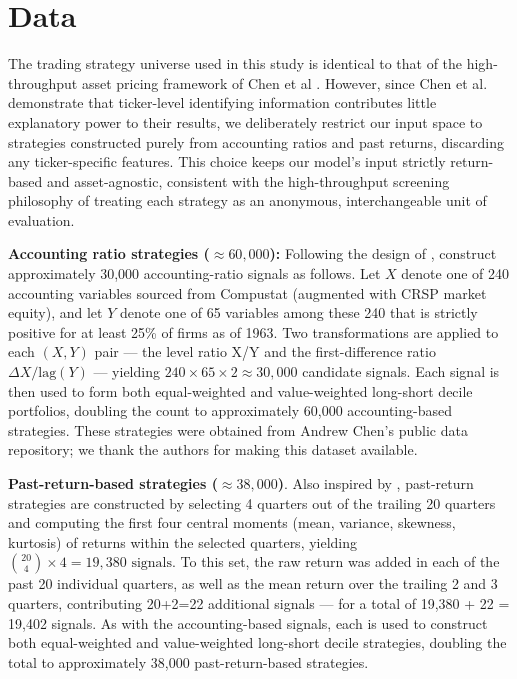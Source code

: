 \documentclass[pdflatex,sn-mathphys-num]{sn-jnl}%
\theoremstyle{thmstyleone}%
\theoremstyle{thmstyletwo}%
\theoremstyle{thmstylethree}%
\begin{document}
\section{Data}\label{sec4}
The trading strategy universe used in this study is identical to that of the high-throughput asset pricing framework of Chen et al \cite{chen2025highthroughputassetpricing}. However, since Chen et al. demonstrate that ticker-level identifying information contributes little explanatory power to their results, we deliberately restrict our input space to strategies constructed purely from accounting ratios and past returns, discarding any ticker-specific features. This choice keeps our model's input strictly return-based and asset-agnostic, consistent with the high-throughput screening philosophy of treating each strategy as an anonymous, interchangeable unit of evaluation.

\textbf{Accounting ratio strategies ($\approx 60,000$):} Following the design of \citet{yan2017fundamental}, \citet{chen2025highthroughputassetpricing} construct approximately 30,000 accounting-ratio signals as follows. Let $X$ denote one of 240 accounting variables sourced from Compustat (augmented with CRSP market equity), and let $Y$ denote one of 65 variables among these 240 that is strictly positive for at least 25\% of firms as of 1963. Two transformations are applied to each $(X, Y)$ pair — the level ratio X/Y and the first-difference ratio $\Delta X / \mathrm{lag}(Y)$ — yielding $240 \times 65 \times 2 \approx 30{,}000$ candidate signals. Each signal is then used to form both equal-weighted and value-weighted long-short decile portfolios, doubling the count to approximately 60,000 accounting-based strategies. These strategies were obtained from Andrew Chen's public data repository; we thank the authors for making this dataset available.

\textbf{Past-return-based strategies ($\approx 38,000$)}. Also inspired by \citet{yan2017fundamental}, past-return strategies are constructed by selecting 4 quarters out of the trailing 20 quarters and computing the first four central moments (mean, variance, skewness, kurtosis) of returns within the selected quarters, yielding $\binom{20}{4} \times 4 = 19{,}380 \text{ signals}$. To this set, the raw return was added in each of the past 20 individual quarters, as well as the mean return over the trailing 2 and 3 quarters, contributing 20+2=22 additional signals — for a total of 19,380 + 22 = 19,402 signals. As with the accounting-based signals, each is used to construct both equal-weighted and value-weighted long-short decile strategies, doubling the total to approximately 38,000 past-return-based strategies.
\end{document}
